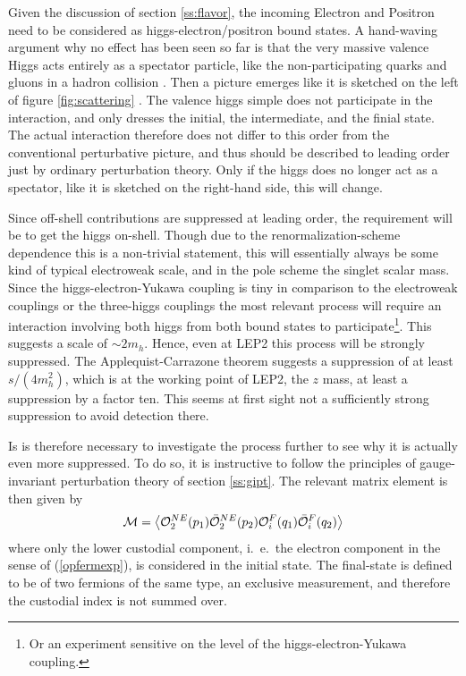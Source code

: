 \documentclass[final,12pt,3p,longtitle]{elsarticle}
\newcommand*{\no}{\noindent}
\newcommand*{\be}{\begin{equation}}
\newcommand*{\ee}{\end{equation}}
\newcommand*{\pref}[1]{(\ref{#1})}
\newcommand*{\1}{1\!\!\!\bot}
\newcommand*{\la}{\left\langle}
\newcommand*{\ra}{\right\rangle}
\begin{document}
Given the discussion of section \ref{ss:flavor}, the incoming Electron and Positron need to be considered as higgs-electron/positron bound states. A hand-waving argument why no effect has been seen so far is that the very massive valence Higgs acts entirely as a spectator particle, like the non-participating quarks and gluons in a hadron collision \cite{BeiglboCk:2006lfa}. Then a picture emerges like it is sketched on the left of  figure \ref{fig:scattering} \cite{Maas:2012tj,Egger:2017tkd}. The valence higgs simple does not participate in the interaction, and only dresses the initial, the intermediate, and the finial state. The actual interaction therefore does not differ to this order from the conventional perturbative picture, and thus should be described to leading order just by ordinary perturbation theory. Only if the higgs does no longer act as a spectator, like it is sketched on the right-hand side, this will change.

Since off-shell contributions are suppressed at leading order, the requirement will be to get the higgs on-shell. Though due to the renormalization-scheme dependence this is a non-trivial statement, this will essentially always be some kind of typical electroweak scale, and in the pole scheme the singlet scalar mass. Since the higgs-electron-Yukawa coupling is tiny in comparison to the electroweak couplings or the three-higgs couplings \cite{pdg} the most relevant process will require an interaction involving both higgs from both bound states to participate\footnote{Or an experiment sensitive on the level of the higgs-electron-Yukawa coupling.}. This suggests a scale of $\sim2m_h$. Hence, even at LEP2 this process will be strongly suppressed. The Applequist-Carrazone theorem \cite{BeiglboCk:2006lfa} suggests a suppression of at least $s/(4m_h^2)$, which is at the working point of LEP2, the $z$ mass, at least a suppression by a factor ten. This seems at first sight not a sufficiently strong suppression to avoid detection there.

Is is therefore necessary to investigate the process further to see why it is actually even more suppressed. To do so, it is instructive to follow the principles of gauge-invariant perturbation theory of section \ref{ss:gipt}. The relevant matrix element is then given by \cite{Egger:2017tkd}
\be
{\cal M}=\la {\cal O}^{NE}_2(p_1){\bar{\cal O}}^{NE}_2(p_2){\cal O}^F_i(q_1){\bar{\cal O}}^F_i(q_2)\ra\label{eeff}
\ee
\no where only the lower custodial component, i.\ e.\ the electron component in the sense of \pref{opfermexp}, is considered in the initial state. The final-state is defined to be of two fermions of the same type, an exclusive measurement, and therefore the custodial index is not summed over.
\end{document}
